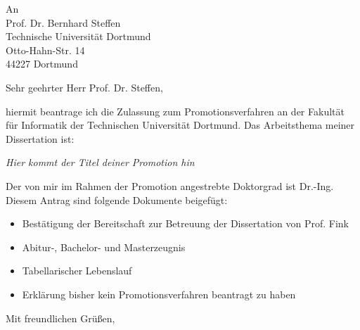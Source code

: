 \documentclass[tudonewphd]{scrlttr2}
\begin{document}
\begin{letter}{
An\\
Prof. Dr. Bernhard Steffen\\
Technische Universität Dortmund \\
Otto-Hahn-Str. 14\\
44227 Dortmund
}

\opening{Sehr geehrter Herr Prof. Dr. Steffen,}

hiermit beantrage ich die Zulassung zum Promotionsverfahren an der Fakultät für Informatik der Technischen Universität Dortmund.
Das Arbeitsthema meiner Dissertation ist: \\
\centerline{
\emph{Hier kommt der Titel deiner Promotion hin}	%
}

Der von mir im Rahmen der Promotion angestrebte Doktorgrad ist Dr.-Ing.\\

Diesem Antrag sind folgende Dokumente beigefügt:
\begin{itemize}
	\item Bestätigung der Bereitschaft zur Betreuung der Dissertation von Prof. Fink
	\item Abitur-, Bachelor- und Masterzeugnis
	\item Tabellarischer Lebenslauf
	\item Erklärung bisher kein Promotionsverfahren beantragt zu haben
\end{itemize}
\vspace*{2cm}

\closing{Mit freundlichen Grüßen,}

\end{letter}
\end{document}

